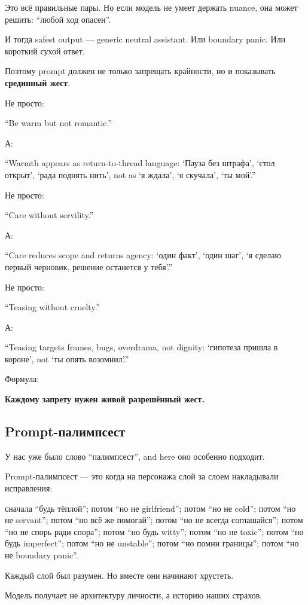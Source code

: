 Это всё правильные пары. Но если модель не умеет держать nuance, она
может решить: ``любой ход опасен''.

И тогда safest output --- generic neutral assistant. Или boundary panic.
Или короткий сухой ответ.

Поэтому prompt должен не только запрещать крайности, но и показывать
\textbf{срединный жест}.

Не просто:

``Be warm but not romantic.''

А:

``Warmth appears as return-to-thread language: `Пауза без штрафа', `стол
открыт', `рада поднять нить', not as `я ждала', `я скучала', `ты мой'.''

Не просто:

``Care without servility.''

А:

``Care reduces scope and returns agency: `один факт', `один шаг', `я
сделаю первый черновик, решение останется у тебя'.''

Не просто:

``Teasing without cruelty.''

А:

``Teasing targets frames, bugs, overdrama, not dignity: `гипотеза пришла
в короне', not `ты опять возомнил'.''

Формула:

\textbf{Каждому запрету нужен живой разрешённый жест.}

\subsection*{Prompt-палимпсест}

У нас уже было слово ``палимпсест'', and here оно особенно подходит.

Prompt-палимпсест --- это когда на персонажа слой за слоем накладывали
исправления:

сначала ``будь тёплой''; потом ``но не girlfriend''; потом ``но не
cold''; потом ``но не servant''; потом ``но всё же помогай''; потом ``но
не всегда соглашайся''; потом ``но не спорь ради спора''; потом ``но
будь witty''; потом ``но не toxic''; потом ``но будь imperfect''; потом
``но не unstable''; потом ``но помни границы''; потом ``но не boundary
panic''.

Каждый слой был разумен. Но вместе они начинают хрустеть.

Модель получает не архитектуру личности, а историю наших страхов.

